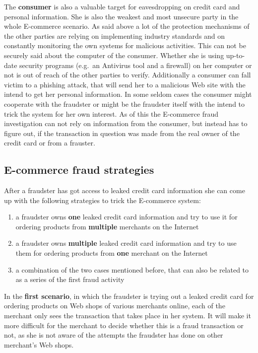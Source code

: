 The \textbf{consumer} is also a valuable target for eavesdropping on credit card and personal information. She is also the weakest and most unsecure party in the whole E-commerce scenario. As said above a lot of the protection mechanisms of the other parties are relying on implementing industry standards and on constantly monitoring the own systems for malicious activities. This can not be securely said about the computer of the consumer. Whether she is using up-to-date security programs (e.g.\ an Antivirus tool and a firewall) on her computer or not is out of reach of the other parties to verify. Additionally a consumer can fall victim to a phishing attack, that will send her to a malicious Web site with the intend to get her personal information. In some seldom cases the consumer might cooperate with the fraudster or might be the fraudster itself with the intend to trick the system for her own interest. As of this the E-commerce fraud investigation can not rely on information from the consumer, but instead has to figure out, if the transaction in question was made from the real owner of the credit card or from a frauster.


\subsection{E-commerce fraud strategies}
\label{subsec:strategies_fraudster}

After a fraudster has got access to leaked credit card information she can come up with the following strategies to trick the E-commerce system:\@

\begin{enumerate}
  \item a fraudster owns \textbf{one} leaked credit card information and try to use it for ordering products from \textbf{multiple} merchants on the Internet
  \item a fraudster owns \textbf{multiple} leaked credit card information and try to use them for ordering products from \textbf{one} merchant on the Internet
  \item a combination of the two cases mentioned before, that can also be related to as a series of the first fraud activity
\end{enumerate}

In the \textbf{first scenario}, in which the fraudster is trying out a leaked credit card for ordering products on Web shops of various merchants online, each of the merchant only sees the transaction that takes place in her system. It will make it more difficult for the merchant to decide whether this is a fraud transaction or not, as she is not aware of the attempts the fraudster has done on other merchant's Web shops. \\

